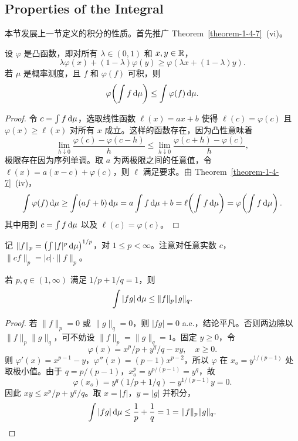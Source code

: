 \subsection{Properties of the Integral}

本节发展上一节定义的积分的性质。首先推广 Theorem~\ref{theorem-1-4-7}~(vi)。

\begin{theorem}\label{theorem-1-5-1}
    设 $\varphi$ 是凸函数，即对所有 $\lambda \in (0,1)$ 和 $x,y \in \mathbb{R}$，
    \[
        \lambda \varphi(x) + (1-\lambda)\varphi(y) \ge \varphi(\lambda x + (1-\lambda)y).
    \]
    若 $\mu$ 是概率测度，且 $f$ 和 $\varphi(f)$ 可积，则
    \[
        \varphi\!\left(\int f \,\mathrm{d}\mu\right) \le \int \varphi(f) \,\mathrm{d}\mu.
    \]
\end{theorem}

\begin{proof}
    令 $c = \int f \,\mathrm{d}\mu$，选取线性函数 $\ell(x) = ax + b$ 使得 $\ell(c) = \varphi(c)$ 且 $\varphi(x) \ge \ell(x)$ 对所有 $x$ 成立。这样的函数存在，因为凸性意味着
    \[
        \lim_{h \downarrow 0} \frac{\varphi(c) - \varphi(c-h)}{h}
        \le \lim_{h \downarrow 0} \frac{\varphi(c+h) - \varphi(c)}{h},
    \]
    极限存在因为序列单调。取 $a$ 为两极限之间的任意值，令 $\ell(x) = a(x-c) + \varphi(c)$，则 $\ell$ 满足要求。由 Theorem~\ref{theorem-1-4-7}~(iv)，
    \[
        \int \varphi(f) \,\mathrm{d}\mu \ge \int (af+b) \,\mathrm{d}\mu = a\int f \,\mathrm{d}\mu + b = \ell\!\left(\int f \,\mathrm{d}\mu\right) = \varphi\!\left(\int f \,\mathrm{d}\mu\right).
    \]
    其中用到 $c = \int f \,\mathrm{d}\mu$ 以及 $\ell(c) = \varphi(c)$。
\end{proof}

记 $\|f\|_p = \left(\int |f|^p \,\mathrm{d}\mu\right)^{1/p}$，对 $1 \le p < \infty$。注意对任意实数 $c$，$\|cf\|_p = |c| \cdot \|f\|_p$。

\begin{theorem}\label{theorem-1-5-2}
    若 $p, q \in (1,\infty)$ 满足 $1/p + 1/q = 1$，则
    \[
        \int |fg| \,\mathrm{d}\mu \le \|f\|_p \|g\|_q.
    \]
\end{theorem}

\begin{proof}
    若 $\|f\|_p = 0$ 或 $\|g\|_q = 0$，则 $|fg| = 0$ a.e.，结论平凡。否则两边除以 $\|f\|_p \|g\|_q$，可不妨设 $\|f\|_p = \|g\|_q = 1$。固定 $y \ge 0$，令
    \[
        \varphi(x) = x^p/p + y^q/q - xy, \quad x \ge 0.
    \]
    则 $\varphi'(x) = x^{p-1} - y$，$\varphi''(x) = (p-1)x^{p-2}$，所以 $\varphi$ 在 $x_o = y^{1/(p-1)}$ 处取极小值。由于 $q = p/(p-1)$，$x_o^p = y^{p/(p-1)} = y^q$，故
    \[
        \varphi(x_o) = y^q(1/p + 1/q) - y^{1/(p-1)} y = 0.
    \]
    因此 $xy \le x^p/p + y^q/q$。取 $x = |f|$，$y = |g|$ 并积分，
    \[
        \int |fg| \,\mathrm{d}\mu \le \frac{1}{p} + \frac{1}{q} = 1 = \|f\|_p \|g\|_q.
    \]
\end{proof}

